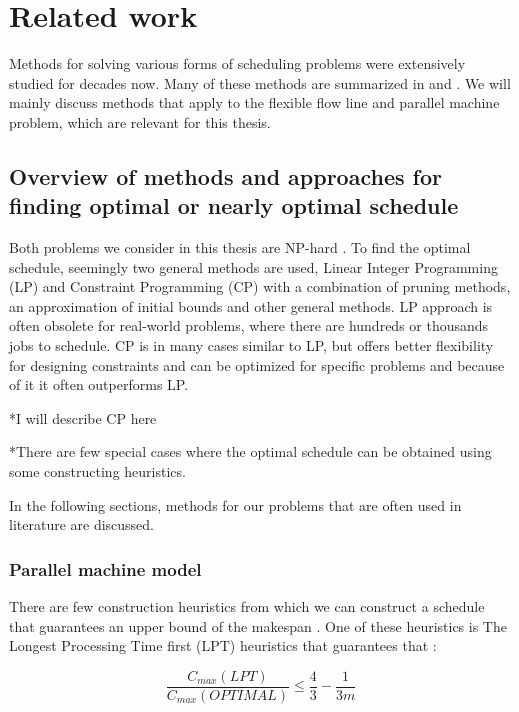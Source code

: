 \documentclass{ctuthesis}
\begin{document}
\chapter{Related work}
\label{chap:Related work}
Methods for solving various forms of scheduling problems were extensively studied for decades now. Many of these methods are summarized in \cite{pinedo} and \cite{bucker}. We will mainly discuss methods that apply to the flexible flow line and parallel machine problem, which are relevant for this thesis. 

\section{Overview of methods and approaches for finding optimal or nearly optimal schedule}

Both problems we consider in this thesis are NP-hard \cite{complexity}. To find the optimal schedule, seemingly two general methods are used, Linear Integer Programming (LP) and Constraint Programming (CP) with a combination of pruning methods, an approximation of initial bounds and other general methods. LP approach is often obsolete for real-world problems, where there are hundreds or thousands jobs to schedule. CP is in many cases similar to LP, but offers better flexibility for designing constraints and can be optimized for specific problems and because of it it often outperforms LP.

*I will describe CP here

*There are few special cases where the optimal schedule can be obtained using some constructing heuristics. 

In the following sections, methods for our problems that are often used in literature are discussed.

\subsection{Parallel machine model}

There are few construction heuristics from which we can construct a schedule that guarantees an upper bound of the makespan \cite{gram}. One of these heuristics is The Longest Processing Time first (LPT) heuristics \cite{pinedo} that guarantees that \cite{gram1969}:

\begin{equation}
\dfrac{C_{max}(LPT)}{C_{max}(OPTIMAL)} \leq \dfrac{4}{3} - \dfrac{1}{3m}
\end{equation}
\end{document}
